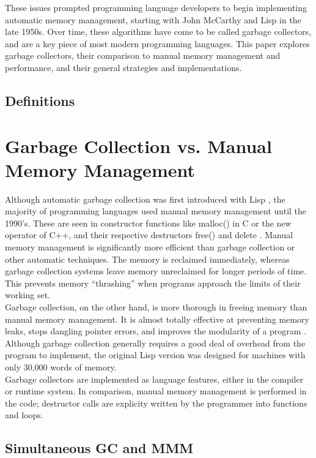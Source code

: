 \documentclass[12pt]{article}
\begin{document}
These issues prompted programming language developers to begin implementing automatic memory management, starting with John McCarthy and Lisp in the late 1950s.\cite{https://www.seas.harvard.edu/courses/cs252/2016fa/16.pdf} Over time, these algorithms have come to be called garbage collectors, and are a key piece of most modern programming languages. This paper explores garbage collectors, their comparison to manual memory management and performance, and their general strategies and implementations. 

\subsection{Definitions}
\section{Garbage Collection vs. Manual Memory Management}
Although automatic garbage collection was first introduced with Lisp \cite{chis11}, the majority of programming languages used manual memory management until the 1990's. These are seen in constructor functions like malloc() in C or the new operator of C++, and their respective destructors free() and delete \cite{pythDocs}. Manual memory management is significantly more efficient than garbage collection or other automatic techniques. The memory is reclaimed immediately, whereas garbage collection systems leave memory unreclaimed for longer periods of time. This prevents memory ``thrashing'' when programs approach the limits of their working set.\\

Garbage collection, on the other hand, is more thorough in freeing memory than manual memory management. It is almost totally effective at preventing memory leaks, stops dangling pointer errors, and improves the modularity of a program \cite{hertz05}. Although garbage collection generally requires a good deal of overhead from the program to implement, the original Lisp version was designed for machines with only 30,000 words of memory.\\

Garbage collectors are implemented as language features, either in the compiler or runtime system. In comparison, manual memory management is performed in the code; destructor calls are explicity written by the programmer into functions and loops.
\subsection{Simultaneous GC and MMM}
\end{document}

